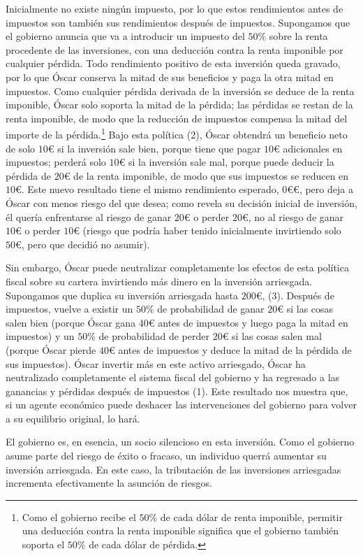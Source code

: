 \documentclass[10pt,a4paper]{article}
\begin{document}
Inicialmente no existe ningún impuesto, por lo que estos rendimientos antes de impuestos son también sus rendimientos después de impuestos. Supongamos que el gobierno anuncia que va a introducir un impuesto del $50\%$ sobre la renta procedente de las inversiones, con una deducción contra la renta imponible por cualquier pérdida. Todo rendimiento positivo de esta inversión queda gravado, por lo que Óscar conserva la mitad de sus beneficios y paga la otra mitad en impuestos. Como cualquier pérdida derivada de la inversión se deduce de la renta imponible, Óscar solo soporta la mitad de la pérdida; las pérdidas se restan de la renta imponible, de modo que la reducción de impuestos compensa la mitad del importe de la pérdida.\footnote{%
    Como el gobierno recibe el $50\%$ de cada dólar de renta imponible, permitir una deducción contra la renta imponible significa que el gobierno también soporta el $50\%$ de cada dólar de pérdida.
} Bajo esta política (2), Óscar obtendrá un beneficio neto de solo $10€$ si la inversión sale bien, porque tiene que pagar $10€$ adicionales en impuestos; perderá solo $10€$ si la inversión sale mal, porque puede deducir la pérdida de $20€$ de la renta imponible, de modo que sus impuestos se reducen en $10€$. Este nuevo resultado tiene el mismo rendimiento esperado, $0€$€, pero deja a Óscar con menos riesgo del que desea; como revela su decisión inicial de inversión, él quería enfrentarse al riesgo de ganar $20€$ o perder $20€$, no al riesgo de ganar $10€$ o perder $10€$ (riesgo que podría haber tenido inicialmente invirtiendo solo $50€$, pero que decidió no asumir).

Sin embargo, Óscar puede neutralizar completamente los efectos de esta política fiscal sobre su cartera invirtiendo más dinero en la inversión arriesgada. Supongamos que duplica su inversión arriesgada hasta $200€$, (3). Después de impuestos, vuelve a existir un $50\%$ de probabilidad de ganar $20€$ si las cosas salen bien (porque Óscar gana $40€$ antes de impuestos y luego paga la mitad en impuestos) y un $50\%$ de probabilidad de perder $20€$ si las cosas salen mal (porque Óscar pierde $40€$ antes de impuestos y deduce la mitad de la pérdida de sus impuestos). Óscar invertir más en este activo arriesgado, Óscar ha neutralizado completamente el sistema fiscal del gobierno y ha regresado a las ganancias y pérdidas después de impuestos (1). Este resultado nos muestra que, si un agente económico puede deshacer las intervenciones del gobierno para volver a su equilibrio original, lo hará.

El gobierno es, en esencia, un socio silencioso en esta inversión. Como el gobierno asume parte del riesgo de éxito o fracaso, un individuo querrá aumentar su inversión arriesgada. En este caso, la tributación de las inversiones arriesgadas incrementa efectivamente la asunción de riesgos.
\end{document}
